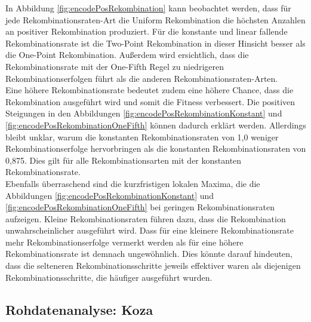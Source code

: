 In Abbildung \ref{fig:encodePosRekombination} kann beobachtet werden, dass für jede Rekombinationsraten-Art die Uniform Rekombination die höchsten Anzahlen an positiver Rekombination produziert.
Für die konstante und linear fallende Rekombinationsrate ist die Two-Point Rekombination in dieser Hinsicht besser als die One-Point Rekombination.
Außerdem wird ersichtlich, dass die Rekombinationsrate mit der One-Fifth Regel zu niedrigeren Rekombinationserfolgen führt als die anderen Rekombinationsraten-Arten.\\
Eine höhere Rekombinationsrate bedeutet zudem eine höhere Chance, dass die Rekombination ausgeführt wird und somit die Fitness verbessert.
Die positiven Steigungen in den Abbildungen \ref{fig:encodePosRekombinationKonstant} und \ref{fig:encodePosRekombinationOneFifth} können dadurch erklärt werden.
Allerdings bleibt unklar, warum die konstanten Rekombinationsraten von 1,0 weniger Rekombinationserfolge hervorbringen als die konstanten Rekombinationsraten von 0,875.
Dies gilt für alle Rekombinationsarten mit der konstanten Rekombinationsrate.\\
Ebenfalls überraschend sind die kurzfristigen lokalen Maxima, die die Abbildungen \ref{fig:encodePosRekombinationKonstant} und \ref{fig:encodePosRekombinationOneFifth} bei geringen Rekombinationsraten aufzeigen.
Kleine Rekombinationsraten führen dazu, dass die Rekombination unwahrscheinlicher ausgeführt wird.
Dass für eine kleinere Rekombinationsrate mehr Rekombinationserfolge vermerkt werden als für eine höhere Rekombinationsrate ist demnach ungewöhnlich.
Dies könnte darauf hindeuten, dass die selteneren Rekombinationsschritte jeweils effektiver waren als diejenigen Rekombinationsschritte, die häufiger ausgeführt wurden.


\subsection{Rohdatenanalyse: Koza}
\label{subsec:rohdatenKoza}

